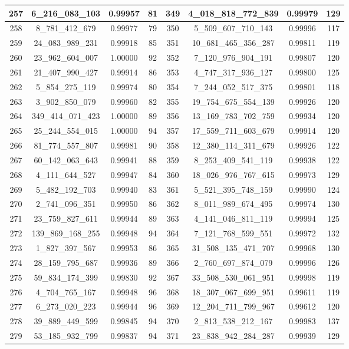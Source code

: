 \documentclass[letterpaper]{article}
\begin{document}
{\begin{tabular}{|c c c c| c c c c|}
\hline
257 & 6\_216\_083\_103 & 0.99957 & 81 & 349 & 4\_018\_818\_772\_839 & 0.99979 & 129 \\
\hline
258 & 8\_781\_412\_679 & 0.99977 & 79 & 350 & 5\_509\_607\_710\_143 & 0.99996 & 117 \\
\hline
259 & 24\_083\_989\_231 & 0.99918 & 85 & 351 & 10\_681\_465\_356\_287 & 0.99811 & 119 \\
\hline
260 & 23\_962\_604\_007 & 1.00000 & 92 & 352 & 7\_120\_976\_904\_191 & 0.99807 & 120 \\
\hline
261 & 21\_407\_990\_427 & 0.99914 & 86 & 353 & 4\_747\_317\_936\_127 & 0.99800 & 125 \\
\hline
262 & 5\_854\_275\_119 & 0.99974 & 80 & 354 & 7\_244\_052\_517\_375 & 0.99801 & 118 \\
\hline
263 & 3\_902\_850\_079 & 0.99960 & 82 & 355 & 19\_754\_675\_554\_139 & 0.99926 & 120 \\
\hline
264 & 349\_414\_071\_423 & 1.00000 & 89 & 356 & 13\_169\_783\_702\_759 & 0.99934 & 120 \\
\hline
265 & 25\_244\_554\_015 & 1.00000 & 94 & 357 & 17\_559\_711\_603\_679 & 0.99914 & 120 \\
\hline
266 & 81\_774\_557\_807 & 0.99981 & 90 & 358 & 12\_380\_114\_311\_679 & 0.99926 & 122 \\
\hline
267 & 60\_142\_063\_643 & 0.99941 & 88 & 359 & 8\_253\_409\_541\_119 & 0.99938 & 122 \\
\hline
268 & 4\_111\_644\_527 & 0.99947 & 84 & 360 & 18\_026\_976\_767\_615 & 0.99973 & 129 \\
\hline
269 & 5\_482\_192\_703 & 0.99940 & 83 & 361 & 5\_521\_395\_748\_159 & 0.99990 & 124 \\
\hline
270 & 2\_741\_096\_351 & 0.99950 & 86 & 362 & 8\_011\_989\_674\_495 & 0.99974 & 130 \\
\hline
271 & 23\_759\_827\_611 & 0.99944 & 89 & 363 & 4\_141\_046\_811\_119 & 0.99994 & 125 \\
\hline
272 & 139\_869\_168\_255 & 0.99948 & 94 & 364 & 7\_121\_768\_599\_551 & 0.99972 & 132 \\
\hline
273 & 1\_827\_397\_567 & 0.99953 & 86 & 365 & 31\_508\_135\_471\_707 & 0.99968 & 130 \\
\hline
274 & 28\_159\_795\_687 & 0.99936 & 89 & 366 & 2\_760\_697\_874\_079 & 0.99996 & 126 \\
\hline
275 & 59\_834\_174\_399 & 0.99830 & 92 & 367 & 33\_508\_530\_061\_951 & 0.99998 & 119 \\
\hline
276 & 4\_704\_765\_167 & 0.99948 & 96 & 368 & 18\_307\_067\_699\_951 & 0.99611 & 119 \\
\hline
277 & 6\_273\_020\_223 & 0.99944 & 96 & 369 & 12\_204\_711\_799\_967 & 0.99612 & 120 \\
\hline
278 & 39\_889\_449\_599 & 0.99845 & 94 & 370 & 2\_813\_538\_212\_167 & 0.99983 & 137 \\
\hline
279 & 53\_185\_932\_799 & 0.99837 & 94 & 371 & 23\_838\_942\_284\_287 & 0.99939 & 129 \\
\hline
\end{tabular}
}
\end{document}

